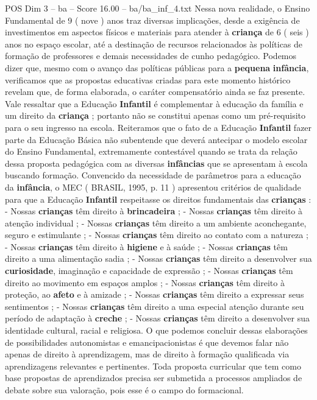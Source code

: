 \begin{textsample}{POS Dim 3 – ba – Score 16.00 – ba/ba\_inf\_4.txt}
Nessa nova realidade, o Ensino Fundamental de 9 ( nove ) anos traz diversas implicações, desde a exigência de investimentos em aspectos físicos e materiais para atender à \textbf{criança} de 6 ( seis ) anos no espaço escolar, até a destinação de recursos relacionados às políticas de formação de professores e demais necessidades de cunho pedagógico.
Podemos dizer que, mesmo com o avanço das políticas públicas para a \textbf{pequena} \textbf{infância}, verificamos que as propostas educativas criadas para este momento histórico revelam que, de forma elaborada, o caráter compensatório ainda se faz presente.
Vale ressaltar que a Educação \textbf{Infantil} é complementar à educação da família e um direito da \textbf{criança} ; portanto não se constitui apenas como um pré-requisito para o seu ingresso na escola.
Reiteramos que o fato de a Educação \textbf{Infantil} fazer parte da Educação Básica não subentende que deverá antecipar o modelo escolar do Ensino Fundamental, extremamente contestável quando se trata da relação dessa proposta pedagógica com as diversas \textbf{infâncias} que se apresentam à escola buscando formação.
Convencido da necessidade de parâmetros para a educação da \textbf{infância}, o MEC ( BRASIL, 1995, p. 11 ) apresentou critérios de qualidade para que a Educação \textbf{Infantil} respeitasse os direitos fundamentais das \textbf{crianças} : - Nossas \textbf{crianças} têm direito à \textbf{brincadeira} ; - Nossas \textbf{crianças} têm direito à atenção individual ; - Nossas \textbf{crianças} têm direito a um ambiente aconchegante, seguro e estimulante ; - Nossas \textbf{crianças} têm direito ao contato com a natureza ; - Nossas \textbf{crianças} têm direito à \textbf{higiene} e à saúde ; - Nossas \textbf{crianças} têm direito a uma alimentação sadia ; - Nossas \textbf{crianças} têm direito a desenvolver sua \textbf{curiosidade}, imaginação e capacidade de expressão ; - Nossas \textbf{crianças} têm direito ao movimento em espaços amplos ; - Nossas \textbf{crianças} têm direito à proteção, ao \textbf{afeto} e à amizade ; - Nossas \textbf{crianças} têm direito a expressar seus sentimentos ; - Nossas \textbf{crianças} têm direito a uma especial atenção durante seu período de adaptação à \textbf{creche} ; - Nossas \textbf{crianças} têm direito a desenvolver sua identidade cultural, racial e religiosa.
O que podemos concluir dessas elaborações de possibilidades autonomistas e emancipacionistas é que devemos falar não apenas de direito à aprendizagem, mas de direito à formação qualificada via aprendizagens relevantes e pertinentes.
Toda proposta curricular que tem como base propostas de aprendizados precisa ser submetida a processos ampliados de debate sobre sua valoração, pois esse é o campo do formacional.

\end{textsample}
